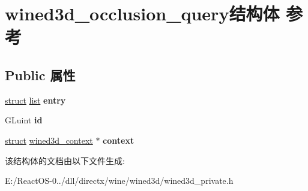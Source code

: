 \hypertarget{structwined3d__occlusion__query}{}\section{wined3d\+\_\+occlusion\+\_\+query结构体 参考}
\label{structwined3d__occlusion__query}
\subsection*{Public 属性}
\begin{DoxyCompactItemize}
\item 
\mbox{\label{structwined3d__occlusion__query_a0ab56e4075860dbdbb71f36f215fd1a3}} 
\hyperlink{interfacestruct}{struct} \hyperlink{classlist}{list} {\bfseries entry}
\item 
\mbox{\label{structwined3d__occlusion__query_a4dfa55492fdf4f201f02b4c0e39fc6c0}} 
G\+Luint {\bfseries id}
\item 
\mbox{\label{structwined3d__occlusion__query_a74994b04390eb9355dc4224ca2bc24c1}} 
\hyperlink{interfacestruct}{struct} \hyperlink{structwined3d__context}{wined3d\+\_\+context} $\ast$ {\bfseries context}
\end{DoxyCompactItemize}


该结构体的文档由以下文件生成\+:\begin{DoxyCompactItemize}
\item 
E\+:/\+React\+O\+S-\/0../dll/directx/wine/wined3d/wined3d\+\_\+private.\+h\end{DoxyCompactItemize}
